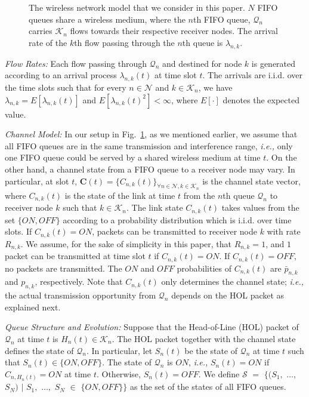 \documentclass[conference]{IEEEtran}
\newcommand{\ie}{{\em i.e., }}
\newcommand{\Sset}{\mathcal{S}}
\newcommand{\Kset}{\mathcal{K}}
\newcommand{\Nset}{\mathcal{N}}
\newcommand{\Qset}{\mathcal{Q}}
\begin{document}
\begin{figure}
\vspace{5pt}
\centering
{}
\vspace{-5pt}
\caption{The wireless network model that we consider in this paper. $N$ FIFO queues share a wireless medium, where the $n$th FIFO queue,  $\Qset_{n}$ carries $\Kset_{n}$ flows towards their respective receiver nodes. The arrival rate of the $k$th flow passing through the $n$th queue is $\lambda_{n,k}$.}
\label{fig:main-example}
\vspace{-15pt}
\end{figure}

{\em Flow Rates:}  Each flow passing through $\Qset_n$ and destined for node $k$ is generated according to an arrival process $\lambda_{n,k}(t)$ at time slot $t$. The arrivals are i.i.d. over the time slots such that for every $n \in \Nset$ and $k \in \Kset_{n}$, we have $\lambda_{n,k} = E[\lambda_{n,k}(t)]$ and $E[\lambda_{n,k}(t)^{2}]<\infty$, where $E[\cdot]$ denotes the expected value.

{\em Channel Model:} In our setup in Fig.~\ref{fig:main-example}, as we mentioned earlier, we assume that all FIFO queues are in the same transmission and interference range, \ie only one FIFO queue could be served by a shared wireless medium at time $t$. On the other hand, a channel state from a FIFO queue to a receiver node may vary. In particular, at slot $t$, $\boldsymbol C(t) = \{C_{n,k}(t)\}_{\forall n \in \Nset, k \in \Kset_{n}}$ is the channel state vector, where $C_{n,k}(t)$ is the state of the link at time $t$ from the $n$th queue $\Qset_{n}$ to receiver node $k$ such that $k \in \Kset_{n}$.  The link state $C_{n,k}(t)$ takes values from the set $\{ON,OFF\}$ according to a probability distribution which is i.i.d. over time slots. If $C_{n,k}(t) = ON$, packets can be transmitted to receiver node $k$ with rate $R_{n,k}$. We assume, for the sake of simplicity in this paper, that $R_{n,k}=1$, and $1$ packet can be transmitted at time slot $t$ if $C_{n,k}(t) = ON$. If $C_{n,k}(t) = OFF$, no packets are transmitted. The $ON$ and $OFF$ probabilities of $C_{n,k}(t)$ are $\bar{p}_{n,k}$ and $p_{n,k}$, respectively. Note that $C_{n,k}(t)$ only determines the channel state; \ie the actual transmission opportunity from $\Qset_n$ depends on the HOL packet as explained next.


{\em Queue Structure and Evolution:}  Suppose that the Head-of-Line (HOL) packet of $\Qset_{n}$ at time $t$ is $H_{n}(t)\in \Kset_{n}$. The HOL packet together with the channel state defines the state of $\Qset_{n}$. In particular, let $S_n(t)$ be the state of $\Qset_{n}$ at time $t$ such that $S_n(t) \in \{ON,OFF\}$. The state of $\Qset_{n}$ is $ON$, \ie $S_{n}(t) = ON$ if $C_{n,H_{n}(t)} = ON$ at time $t$. Otherwise, $S_{n}(t) = OFF$. We define $\Sset$ $=$ $\{ (S_1,$ $\ldots,$ $S_N)$ $|$ $S_1,$ $\ldots,$ $S_N$ $\in$ $\{ON,OFF\} \}$ as the set of the states of all FIFO queues.
\end{document}
